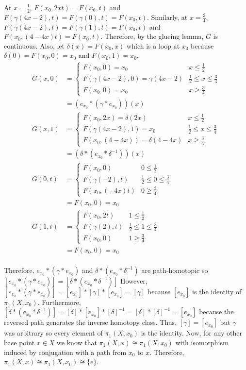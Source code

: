\documentclass[12pt]{extarticle}
\begin{document}
\begin{enumerate}
At $x = \frac{1}{2}$, $F(x_0, 2xt) = F(x_0, t)$ and $F(\gamma(4x - 2), t) = F(\gamma(0), t) = F(x_0, t)$. Similarly, at $x = \frac{3}{4}$, $F(\gamma(4x - 2), t) = F(\gamma(1), t) = F(x_0, t)$ and $F(x_0, (4 - 4x)t) = F(x_0, t)$. Therefore, by the glueing lemma, $G$ is continuous. Also, let $\delta(x) = F(x_0, x)$ which is a loop at $x_0$ because $\delta(0) = F(x_0, 0) = x_0$ and $F(x_0, 1) = x_0$. 
\begin{align*}
G(x, 0) &= 
\begin{cases}
F(x_0, 0) = x_0 & x \le \frac{1}{2} \\
F(\gamma(4x - 2), 0) = \gamma(4x - 2) & \frac{1}{2} \le x \le \frac{3}{4} \\
F(x_0, 0) = x_0 & x \ge \frac{3}{4}
\end{cases} \\ 
& = (e_{x_0} * (\gamma * e_{x_0}))(x) \\
G(x, 1) &= 
\begin{cases}
F(x_0, 2x) = \delta(2x) & x \le \frac{1}{2} \\
F(\gamma(4x - 2), 1) = x_0 & \frac{1}{2} \le x \le \frac{3}{4} \\
F(x_0, (4 - 4x)) = \delta(4 - 4x) & x \ge \frac{3}{4}
\end{cases} \\ 
& = (\delta * (e_{x_0} * \delta^{-1}))(x) \\
G(0, t) &= 
\begin{cases}
F(x_0, 0) & 0 \le \frac{1}{2} \\
F(\gamma(-2), t) & \frac{1}{2} \le 0 \le \frac{3}{4} \\
F(x_0, (-4x)t) & 0 \ge \frac{3}{4}
\end{cases} \\
& = F(x_0, 0) = x_0 \\
G(1, t) &= 
\begin{cases}
F(x_0, 2t) & 1 \le \frac{1}{2} \\
F(\gamma(2), t) & \frac{1}{2} \le 1 \le \frac{3}{4} \\
F(x_0, 0) & 1 \ge \frac{3}{4}
\end{cases} \\
& = F(x_0, 0) = x_0 \\
\end{align*}

Therefore, $e_{x_0} * (\gamma * e_{x_0})$ and $\delta * (e_{x_0} * \delta^{-1})$ are path-homotopic so $[e_{x_0} * (\gamma * e_{x_0})] = [\delta * (e_{x_0} * \delta^{-1})]$ However, $[e_{x_0} * (\gamma * e_{x_0})] = [e_{x_0}] * [\gamma] * [e_{x_0}] = [\gamma]$ because $[e_{x_0}]$ is the identity of $\pi_1(X, x_0)$. Furthermore, $[\delta * (e_{x_0} * \delta^{-1})] = [\delta] * [e_{x_0}] * [\delta]^{-1} = [\delta] * [\delta]^{-1} = [e_{x_0}]$ because the reversed path generates the inverse homotopy class. Thus, $[\gamma] = [e_{x_0}]$ but $\gamma$ was arbitrary so every element of $\pi_1(X, x_0)$ is the identity. Now, for any other base point $x \in X$ we know that $\pi_1(X, x) \cong \pi_1(X, x_0)$ with isomorphism induced by conjugation with a path from $x_0$ to $x$. Therefore, $\pi_1(X, x) \cong \pi_1(X, x_0) \cong \{e\}$. 


\end{enumerate}
\end{document}
